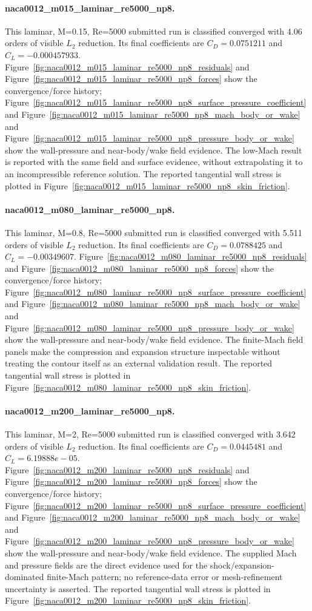 \paragraph{naca0012\_m015\_laminar\_re5000\_np8.} This laminar, M=0.15, Re=5000 submitted run is classified converged with 4.06 orders of visible $L_2$ reduction. Its final coefficients are $C_D=0.0751211$ and $C_L=-0.000457933$. Figure~\ref{fig:naca0012_m015_laminar_re5000_np8_residuals} and Figure~\ref{fig:naca0012_m015_laminar_re5000_np8_forces} show the convergence/force history; Figure~\ref{fig:naca0012_m015_laminar_re5000_np8_surface_pressure_coefficient} and Figure~\ref{fig:naca0012_m015_laminar_re5000_np8_mach_body_or_wake} and Figure~\ref{fig:naca0012_m015_laminar_re5000_np8_pressure_body_or_wake} show the wall-pressure and near-body/wake field evidence. The low-Mach result is reported with the same field and surface evidence, without extrapolating it to an incompressible reference solution. The reported tangential wall stress is plotted in Figure~\ref{fig:naca0012_m015_laminar_re5000_np8_skin_friction}.
\paragraph{naca0012\_m080\_laminar\_re5000\_np8.} This laminar, M=0.8, Re=5000 submitted run is classified converged with 5.511 orders of visible $L_2$ reduction. Its final coefficients are $C_D=0.0788425$ and $C_L=-0.00349607$. Figure~\ref{fig:naca0012_m080_laminar_re5000_np8_residuals} and Figure~\ref{fig:naca0012_m080_laminar_re5000_np8_forces} show the convergence/force history; Figure~\ref{fig:naca0012_m080_laminar_re5000_np8_surface_pressure_coefficient} and Figure~\ref{fig:naca0012_m080_laminar_re5000_np8_mach_body_or_wake} and Figure~\ref{fig:naca0012_m080_laminar_re5000_np8_pressure_body_or_wake} show the wall-pressure and near-body/wake field evidence. The finite-Mach field panels make the compression and expansion structure inspectable without treating the contour itself as an external validation result. The reported tangential wall stress is plotted in Figure~\ref{fig:naca0012_m080_laminar_re5000_np8_skin_friction}.
\paragraph{naca0012\_m200\_laminar\_re5000\_np8.} This laminar, M=2, Re=5000 submitted run is classified converged with 3.642 orders of visible $L_2$ reduction. Its final coefficients are $C_D=0.0445481$ and $C_L=6.19888e-05$. Figure~\ref{fig:naca0012_m200_laminar_re5000_np8_residuals} and Figure~\ref{fig:naca0012_m200_laminar_re5000_np8_forces} show the convergence/force history; Figure~\ref{fig:naca0012_m200_laminar_re5000_np8_surface_pressure_coefficient} and Figure~\ref{fig:naca0012_m200_laminar_re5000_np8_mach_body_or_wake} and Figure~\ref{fig:naca0012_m200_laminar_re5000_np8_pressure_body_or_wake} show the wall-pressure and near-body/wake field evidence. The supplied Mach and pressure fields are the direct evidence used for the shock/expansion-dominated finite-Mach pattern; no reference-data error or mesh-refinement uncertainty is asserted. The reported tangential wall stress is plotted in Figure~\ref{fig:naca0012_m200_laminar_re5000_np8_skin_friction}.

